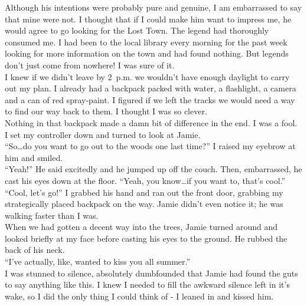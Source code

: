\documentclass[a5paper]{scrartcl}
\begin{document}
Although his intentions were probably pure and genuine, I am embarrassed to say that mine were not. I thought that if I could make him want to impress me, he would agree to go looking for the Lost Town. The legend had thoroughly consumed me. I had been to the local library every morning for the past week looking for more information on the town and had found nothing. But legends don't just come from nowhere! I was sure of it.\\


I knew if we didn't leave by 2~p.m. we wouldn't have enough daylight to carry out my plan. I already had a backpack packed with water, a flashlight, a camera and a can of red spray-paint. I figured if we left the tracks we would need a way to find our way back to them. I thought I was so clever. \\


Nothing in that backpack made a damn bit of difference in the end. I was a fool.    \\


I set my controller down and turned to look at Jamie. \\


\enquote{So\dots do you want to go out to the woods one last time?} I raised my eyebrow at him and smiled. \\


\enquote{Yeah!} He said excitedly and he jumped up off the couch. Then, embarrassed, he cast his eyes down at the floor. \enquote{Yeah, you know\dots if you want to, that's cool.}\\


\enquote{Cool, let's go!} I grabbed his hand and ran out the front door, grabbing my strategically placed backpack on the way. Jamie didn't even notice it; he was walking faster than I was.\\


When we had gotten a decent way into the trees, Jamie turned around and looked briefly at my face before casting his eyes to the ground. He rubbed the back of his neck.\\


\enquote{I've actually, like, wanted to kiss you all summer.}\\


I was stunned to silence, absolutely dumbfounded that Jamie had found the guts to say anything like this. I knew I needed to fill the awkward silence left in it's wake, so I did the only thing I could think of - I leaned in and kissed him. \\
\end{document}
